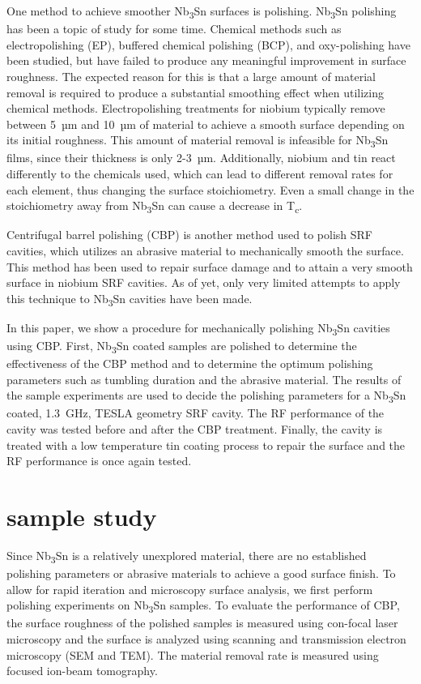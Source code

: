 \documentclass[reprint,amsmath,amssymb,aps]{revtex4-2}%
\begin{document}
One method to achieve smoother Nb\textsubscript{3}Sn surfaces is polishing. Nb\textsubscript{3}Sn polishing has been a topic of study for some time. Chemical methods such as electropolishing (EP)\cite{pudasaini2018studies,pudasaini2017post,hu2019reducing}, buffered chemical polishing (BCP)\cite{pudasaini2017post,hu2019reducing}, and oxy-polishing\cite{pudasaini2017post,pudasaini2018studies} have been studied, but have failed to produce any meaningful improvement in surface roughness. The expected reason for this is that a large amount of material removal is required to produce a substantial smoothing effect when utilizing chemical methods. Electropolishing treatments for niobium typically remove between 5~µm and 10~µm of material to achieve a smooth surface depending on its initial roughness. This amount of material removal is infeasible for Nb\textsubscript{3}Sn films, since their thickness is only 2-3~µm. Additionally, niobium and tin react differently to the chemicals used, which can lead to different removal rates for each element, thus changing the surface stoichiometry. Even a small change in the stoichiometry away from Nb\textsubscript{3}Sn can cause a decrease in T\textsubscript{c}\cite{sitaraman2021effect}.

Centrifugal barrel polishing (CBP) is another method used to polish SRF cavities, which utilizes an abrasive material to mechanically smooth the surface. This method has been used to repair surface damage and to attain a very smooth surface in niobium SRF cavities\cite{cooper2012mirror}. As of yet, only very limited attempts to apply this technique to Nb\textsubscript{3}Sn cavities have been made.

In this paper, we show a procedure for mechanically polishing Nb\textsubscript{3}Sn cavities using CBP. First, Nb\textsubscript{3}Sn coated samples are polished to determine the effectiveness of the CBP method and to determine the optimum polishing parameters such as tumbling duration and the abrasive material. The results of the sample experiments are used to decide the polishing parameters for a Nb\textsubscript{3}Sn coated, 1.3~GHz, TESLA geometry SRF cavity. The RF performance of the cavity was tested before and after the CBP treatment. Finally, the cavity is treated with a low temperature tin coating process to repair the surface and the RF performance is once again tested.

%
\section{sample study}%
\label{sec:samplestudy}%
Since Nb\textsubscript{3}Sn is a relatively unexplored material, there are no established polishing parameters or abrasive materials to achieve a good surface finish. To allow for rapid iteration and microscopy surface analysis, we first perform polishing experiments on Nb\textsubscript{3}Sn samples. To evaluate the performance of CBP, the surface roughness of the polished samples is measured using con-focal laser microscopy and the surface is analyzed using scanning and transmission electron microscopy (SEM and TEM). The material removal rate is measured using focused ion-beam tomography.
%
\end{document}

